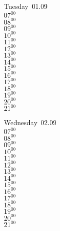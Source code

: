 \documentclass[11pt,a4paper]{book}\usepackage[]{graphicx}\usepackage[]{color}
\begin{document}
{{{{{{{{\begin{tcolorbox}
Tuesday~01.09\\
{ 
$07^{00}$\\
$08^{00}$\\
$09^{00}$\\
$10^{00}$\\
$11^{00}$\\
$12^{00}$\\
$13^{00}$\\
$14^{00}$\\
$15^{00}$\\
$16^{00}$\\
$17^{00}$\\
$18^{00}$\\
$19^{00}$\\
$20^{00}$\\
$21^{00}$}\\
\end{tcolorbox}
%
\begin{tcolorbox}
Wednesday~02.09\\
{ 
$07^{00}$\\
$08^{00}$\\
$09^{00}$\\
$10^{00}$\\
$11^{00}$\\
$12^{00}$\\
$13^{00}$\\
$14^{00}$\\
$15^{00}$\\
$16^{00}$\\
$17^{00}$\\
$18^{00}$\\
$19^{00}$\\
$20^{00}$\\
$21^{00}$}\\
\end{tcolorbox}
\clearpage
%
}}}}}}}}
\end{document}

